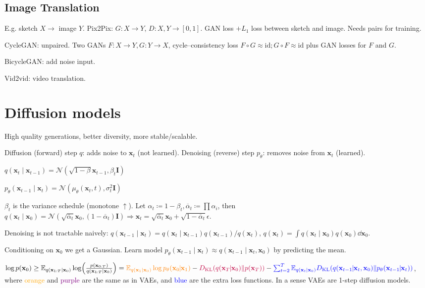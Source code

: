 \documentclass[11pt,landscape,a4paper,fleqn]{article}
\newcommand{\kl}[2]{D_{\mathrm{KL}}(#1\lVert#2)}
\newcommand{\E}{\mathbb{E}}
\def\myvector#1{\mathbf{#1}}
\def\vx{{\myvector{x}}}
\def\mymatrix#1{\mathbf{#1}}
\def\mI{{\mymatrix{I}}}
\begin{document}
\begin{multicols*}{4}
\subsection{Image Translation}

E.g. sketch $X \to$ image $Y$.
Pix2Pix:
$G : X \to Y$,
$D : X, Y \to [0, 1]$.
GAN loss $+ L_1$ loss between sketch and image.
Needs pairs for training.

CycleGAN: unpaired.
Two GANs $F: X \to Y, G : Y \to X$,
cycle--consistency loss $F \circ G \approx \mathrm{id}; G \circ F \approx \mathrm{id}$
plus GAN losses for $F$ and $G$.

BicycleGAN: add noise input.

Vid2vid: video translation.

\section{Diffusion models}

High quality generations, better diversity, more stable/scalable.

Diffusion (forward) step $q$: adds noise to $\vx_t$ (not learned).
Denoising (reverse) step $p_\theta$: removes noise from $\vx_t$ (learned).

$q(\vx_t \mid \vx_{t-1}) = \mathcal{N}(\sqrt{1 - \beta} \vx_{t-1}, \beta_t \mI)$

$p_\theta(\vx_{t-1} \mid \vx_t) = \mathcal{N}(\mu_\theta(\vx_t, t), \sigma_t^2 \mI)$

$\beta_t$ is the variance schedule (monotone $\uparrow$).
Let $\alpha_t \coloneqq 1 - \beta_t, \overline{\alpha}_t \coloneqq \prod \alpha_i$,
then $q(\vx_t \mid \vx_0) = \mathcal{N}(\sqrt{\overline{\alpha}_t} \vx_0, (1 - \overline{\alpha}_t)\mI)
\Rightarrow \vx_t = \sqrt{\overline{\alpha}_t} \vx_0 + \sqrt{1 - \overline{\alpha}_t}\epsilon$.

Denoising is not tractable naively:
$q(\vx_{t-1} \mid \vx_t) = q(\vx_t \mid \vx_{t-1}) q(\vx_{t-1}) / q(\vx_t)$,
$q(\vx_t) = \int q(\vx_t \mid \vx_0) q(\vx_0) \dd \vx_0$.

Conditioning on $\vx_0$ we get a Gaussian.
Learn model $p_\theta(\vx_{t-1} \mid \vx_t) \approx q(\vx_{t-1} \mid \vx_t, \vx_0)$
by predicting the mean.

$\log p(\vx_0) \geq \E_{q(\vx_{1:T} \mid \vx_0)} \log(\frac{p(\vx_{0:T})}{q(\vx_{1:T} \mid \vx_0)}) =
\textcolor{orange}{\E_{q(\vx_1 \mid \vx_0)}\log p_\theta(\vx_0 \!\!\mid\!\! \vx_1)} -
\textcolor{purple}{\kl{q(\vx_T \!\!\mid\!\! \vx_0)}{p(\vx_T)}} -
\textcolor{blue}{\sum_{t = 2}^T \E_{q(\vx_t \mid \vx_0)} \kl{q(\vx_{t-1} \!\!\mid\!\! \vx_t, \vx_0)}{p_\theta(\vx_{t-1} \!\!\mid\!\! \vx_t)}}$,
where \textcolor{orange}{orange} and \textcolor{purple}{purple} are the same as in VAEs,
and \textcolor{blue}{blue} are the extra loss functions.
In a sense VAEs are 1-step diffusion models.


\end{multicols*}
\end{document}
